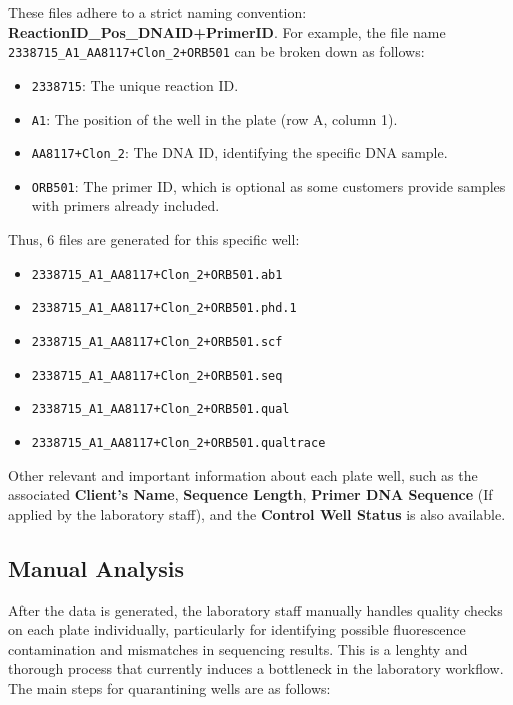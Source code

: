 These files adhere to a strict naming convention: \textbf{ReactionID\_Pos\_DNAID+PrimerID}. 
For example, the file name \texttt{2338715\_A1\_AA8117+Clon\_2+ORB501} can be broken down as follows:
\begin{itemize}
  \item \texttt{2338715}: The unique reaction ID.
  \item \texttt{A1}: The position of the well in the plate (row A, column 1).
  \item \texttt{AA8117+Clon\_2}: The DNA ID, identifying the specific DNA sample.
  \item \texttt{ORB501}: The primer ID, which is optional as some customers provide samples with primers already included.
\end{itemize}
Thus, 6 files are generated for this specific well: 
\begin{itemize}
  \item \texttt{2338715\_A1\_AA8117+Clon\_2+ORB501.ab1}
  \item \texttt{2338715\_A1\_AA8117+Clon\_2+ORB501.phd.1}
  \item \texttt{2338715\_A1\_AA8117+Clon\_2+ORB501.scf}
  \item \texttt{2338715\_A1\_AA8117+Clon\_2+ORB501.seq}
  \item \texttt{2338715\_A1\_AA8117+Clon\_2+ORB501.qual}
  \item \texttt{2338715\_A1\_AA8117+Clon\_2+ORB501.qualtrace}
\end{itemize}

Other relevant and important information about each plate well, such as the associated \textbf{Client's Name}, \textbf{Sequence Length}, \textbf{Primer DNA Sequence} (If applied by the laboratory staff), and the \textbf{Control Well Status} is also available.  

\subsection{Manual Analysis}

After the data is generated, the laboratory staff manually handles quality checks on each plate individually, particularly for identifying possible fluorescence contamination and mismatches in sequencing results. This is a lenghty and thorough process that currently induces a bottleneck in the laboratory workflow. The main steps for quarantining wells are as follows:

